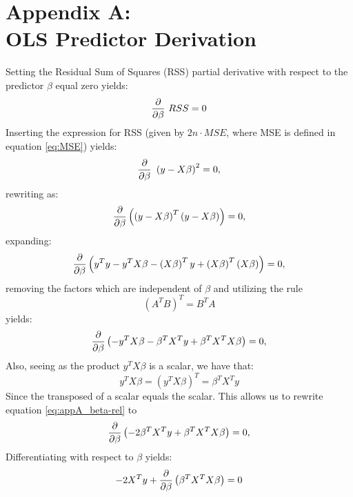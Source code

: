 \section*{Appendix A:\\OLS Predictor Derivation}
    Setting the Residual Sum of Squares (RSS) partial derivative with respect to the predictor $\beta$ equal zero yields:
    \begin{equation}
        \pdv{}{\beta}\ RSS = 0
    \end{equation}
    Inserting the expression for RSS (given by $2n\cdot MSE$, where MSE is defined in equation \ref{eq:MSE}) yields:
    \begin{equation}
        \pdv{}{\beta}\ \left( y - X \beta \right)^2 = 0,
    \end{equation}
    rewriting as:
    \begin{equation}
        \pdv{}{\beta}\left( \left( y - X \beta \right)^T\left( y - X \beta \right)\right) = 0,
    \end{equation}
    expanding:
    \begin{equation}
        \pdv{}{\beta}\left( y^Ty - y^TX\beta - \left( X\beta \right)^Ty + \left( X\beta \right)^T\left( X\beta \right) \right) = 0,
    \end{equation}
    removing the factors which are independent of $\beta$ and utilizing the rule
    \begin{equation}
        \left( A^TB \right)^T = B^TA
    \end{equation}
    yields:
    \begin{equation}\label{eq:appA_beta-rel}
        \pdv{}{\beta}\left(- y^TX\beta - \beta^TX^T y + \beta^TX^TX\beta \right) = 0,
    \end{equation}
    Also, seeing as the product $y^TX\beta$ is a scalar, we have that:
    \begin{equation}
        y^TX\beta = \left( y^TX\beta \right)^T = \beta^TX^Ty
    \end{equation}
    Since the transposed of a scalar equals the scalar. This allows us to rewrite equation \ref{eq:appA_beta-rel} to
    \begin{equation}
        \pdv{}{\beta}\left(- 2 \beta^TX^T y + \beta^TX^TX\beta \right) = 0,
    \end{equation}
    Differentiating with respect to $\beta$ yields:
    \begin{equation}
        -2 X^Ty + \pdv{}{\beta} \left( \beta^TX^TX\beta \right) = 0
    \end{equation}
